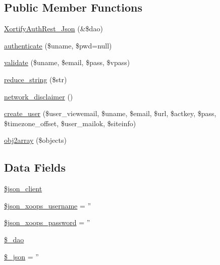 \subsection*{Public Member Functions}
\begin{DoxyCompactItemize}
\item 
\hyperlink{class_xortify_auth_rest___json_a49655248be6ee9b8888388b9137f433c}{Xortify\-Auth\-Rest\-\_\-\-Json} (\&\$dao)
\item 
\hyperlink{class_xortify_auth_rest___json_a00678ba307326b734e6c679f28bea315}{authenticate} (\$uname, \$pwd=null)
\item 
\hyperlink{class_xortify_auth_rest___json_a91121a1b702dfd20fb65a027c8ed26ec}{validate} (\$uname, \$email, \$pass, \$vpass)
\item 
\hyperlink{class_xortify_auth_rest___json_ae463a3baa44e95fa5b5151ab2334df1c}{reduce\-\_\-string} (\$str)
\item 
\hyperlink{class_xortify_auth_rest___json_a1874c27b6f81a3f2ff9015405ad0f8bc}{network\-\_\-disclaimer} ()
\item 
\hyperlink{class_xortify_auth_rest___json_ac72efc5ad313a592cf6706876f56f7ec}{create\-\_\-user} (\$user\-\_\-viewemail, \$uname, \$email, \$url, \$actkey, \$pass, \$timezone\-\_\-offset, \$user\-\_\-mailok, \$siteinfo)
\item 
\hyperlink{class_xortify_auth_rest___json_aabc52e4f78557f0e0b360a8aaba6e11d}{obj2array} (\$objects)
\end{DoxyCompactItemize}
\subsection*{Data Fields}
\begin{DoxyCompactItemize}
\item 
\hyperlink{class_xortify_auth_rest___json_a2d091f9d959cab9ac28ad2cc96149447}{\$json\-\_\-client}
\item 
\hyperlink{class_xortify_auth_rest___json_ac058687d82a56fb93513e7e58c4ec391}{\$json\-\_\-xoops\-\_\-username} = ''
\item 
\hyperlink{class_xortify_auth_rest___json_a7af311f07c1c09254920e6ac0cefe9a9}{\$json\-\_\-xoops\-\_\-password} = ''
\item 
\hyperlink{class_xortify_auth_rest___json_a12a029c610f699b4b25e79a1f64a3485}{\$\-\_\-dao}
\item 
\hyperlink{class_xortify_auth_rest___json_a94787b37d92a2dee02534eed4f316589}{\$\-\_\-json} = ''
\end{DoxyCompactItemize}


